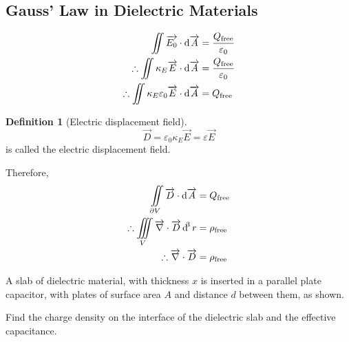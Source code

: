 \documentclass[fleqn, a4paper, 12pt, twoside]{article}
\theoremstyle{definition}
\newtheorem{definition}{Definition}
\theoremstyle{theorem}
\begin{document}
\subsection{Gauss' Law in Dielectric Materials}

\begin{align*}
	\iint \overrightarrow{E_0} \cdot \dif \overrightarrow{A}                                 & = \dfrac{Q_{\textnormal{free}}}{\varepsilon_0} \\
	\therefore \iint \kappa_E \overrightarrow{E} \cdot \dif \overrightarrow{A}               & = \dfrac{Q_{\textnormal{free}}}{\varepsilon_0} \\
	\therefore \iint \kappa_E \varepsilon_0 \overrightarrow{E} \cdot \dif \overrightarrow{A} & = Q_{\textnormal{free}}
\end{align*}

\begin{definition}[Electric displacement field]
	\begin{equation*}
		\overrightarrow{D} = \varepsilon_0 \kappa_E \overrightarrow{E} = \varepsilon \overrightarrow{E}
	\end{equation*}
	is called the electric displacement field.
\end{definition}

Therefore,
\begin{align*}
	\iint\limits_{\partial V} \overrightarrow{D} \cdot \dif \overrightarrow{A}             & = Q_{\textnormal{free}}    \\
	\therefore \iiint\limits_{V} \overrightarrow{\nabla} \cdot \overrightarrow{D} \dif^3 r & = \rho_{\textnormal{free}} \\
	\therefore \overrightarrow{\nabla} \cdot \overrightarrow{D}                            & = \rho_{\textnormal{free}}
\end{align*}

\begin{question}
	A slab of dielectric material, with thickness $x$ is inserted in a parallel plate capacitor, with plates of surface area $A$ and distance $d$ between them, as shown.
	\begin{figure}[H]
	\end{figure}
	Find the charge density on the interface of the dielectric slab and the effective capacitance.
\end{question}
\end{document}
